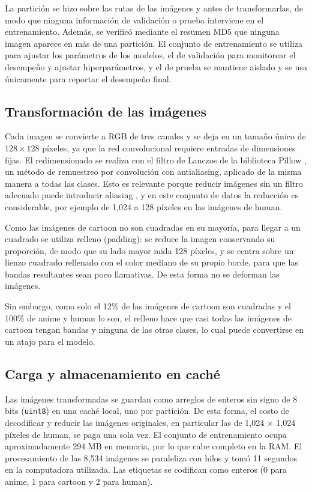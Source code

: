 \documentclass[letterpaper, 10 pt, conference]{ieeeconf}
\begin{document}
La partición se hizo sobre las rutas de las imágenes y antes de transformarlas, de modo que ninguna información de validación o prueba interviene en el entrenamiento. Además, se verificó mediante el resumen MD5 que ninguna imagen aparece en más de una partición. El conjunto de entrenamiento se utiliza para ajustar los parámetros de los modelos, el de validación para monitorear el desempeño y ajustar hiperparámetros, y el de prueba se mantiene aislado y se usa únicamente para reportar el desempeño final.

\subsection{Transformación de las imágenes}

Cada imagen se convierte a RGB de tres canales y se deja en un tamaño único de $128 \times 128$ píxeles, ya que la red convolucional requiere entradas de dimensiones fijas. El redimensionado se realiza con el filtro de Lanczos de la biblioteca Pillow \cite{pillow}, un método de remuestreo por convolución con antialiasing, aplicado de la misma manera a todas las clases. Esto es relevante porque reducir imágenes sin un filtro adecuado puede introducir aliasing \cite{aliasing}, y en este conjunto de datos la reducción es considerable, por ejemplo de 1,024 a 128 píxeles en las imágenes de human.

Como las imágenes de cartoon no son cuadradas en su mayoría, para llegar a un cuadrado se utiliza relleno (padding): se reduce la imagen conservando su proporción, de modo que su lado mayor mida 128 píxeles, y se centra sobre un lienzo cuadrado rellenado con el color mediano de su propio borde, para que las bandas resultantes sean poco llamativas. De esta forma no se deforman las imágenes.

Sin embargo, como solo el 12\% de las imágenes de cartoon son cuadradas y el 100\% de anime y human lo son, el relleno hace que casi todas las imágenes de cartoon tengan bandas y ninguna de las otras clases, lo cual puede convertirse en un atajo para el modelo.

\subsection{Carga y almacenamiento en caché}

Las imágenes transformadas se guardan como arreglos de enteros sin signo de 8 bits (\texttt{uint8}) en una caché local, uno por partición. De esta forma, el costo de decodificar y reducir las imágenes originales, en particular las de 1,024 $\times$ 1,024 píxeles de human, se paga una sola vez. El conjunto de entrenamiento ocupa aproximadamente 294 MB en memoria, por lo que cabe completo en la RAM. El procesamiento de las 8,534 imágenes se paraleliza con hilos y tomó 11 segundos en la computadora utilizada. Las etiquetas se codifican como enteros (0 para anime, 1 para cartoon y 2 para human).
\end{document}
